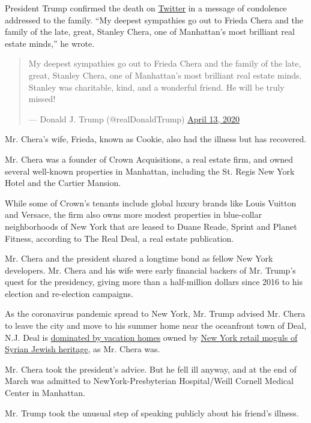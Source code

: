 President Trump confirmed the death on
\href{https://twitter.com/realDonaldTrump/status/1249808119217172489}{Twitter}
in a message of condolence addressed to the family. ``My deepest
sympathies go out to Frieda Chera and the family of the late, great,
Stanley Chera, one of Manhattan's most brilliant real estate minds,'' he
wrote.

\begin{quote}
My deepest sympathies go out to Frieda Chera and the family of the late,
great, Stanley Chera, one of Manhattan's most brilliant real estate
minds. Stanley was charitable, kind, and a wonderful friend. He will be
truly missed!

--- Donald J. Trump (@realDonaldTrump)
\href{https://twitter.com/realDonaldTrump/status/1249808119217172489?ref_src=twsrc\%5Etfw}{April
13, 2020}
\end{quote}

Mr. Chera's wife, Frieda, known as Cookie, also had the illness but has
recovered.

Mr. Chera was a founder of Crown Acquisitions, a real estate firm, and
owned several well-known properties in Manhattan, including the St.
Regis New York Hotel and the Cartier Mansion.

While some of Crown's tenants include global luxury brands like Louis
Vuitton and Versace, the firm also owns more modest properties in
blue-collar neighborhoods of New York that are leased to Duane Reade,
Sprint and Planet Fitness, according to The Real Deal, a real estate
publication.

Mr. Chera and the president shared a longtime bond as fellow New York
developers. Mr. Chera and his wife were early financial backers of Mr.
Trump's quest for the presidency, giving more than a half-million
dollars since 2016 to his election and re-election campaigns.

As the coronavirus pandemic spread to New York, Mr. Trump advised Mr.
Chera to leave the city and move to his summer home near the oceanfront
town of Deal, N.J. Deal is
\href{https://therealdeal.com/issues_articles/dominating-deal/}{dominated
by vacation homes} owned by
\href{https://www.nytimes.com/2009/07/25/nyregion/25deal.html}{New York
retail moguls of Syrian Jewish heritage}, as Mr. Chera was.

Mr. Chera took the president's advice. But he fell ill anyway, and at
the end of March was admitted to NewYork-Presbyterian Hospital/Weill
Cornell Medical Center in Manhattan.

Mr. Trump took the unusual step of speaking publicly about his friend's
illness.

